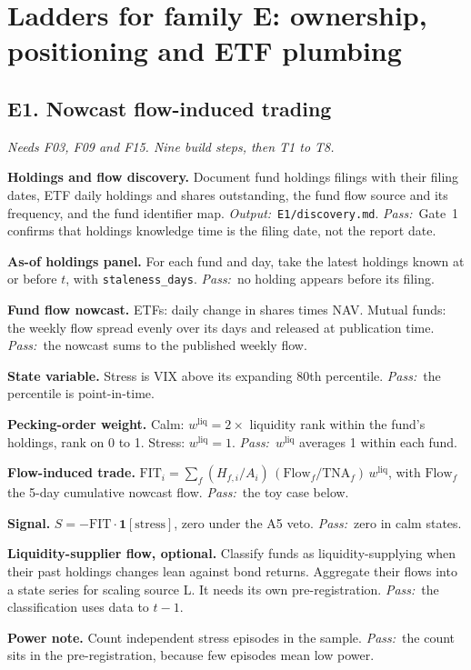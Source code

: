 \documentclass[11pt,letterpaper]{article}
\makeatletter
\newcommand{\code}[1]{\texttt{#1}}
\newcommand{\ind}[1]{\mathbf{1}\!\left[#1\right]}
\newcommand{\FIT}{\mathrm{FIT}}
\newcommand*{\twodigit}[1]{\expandafter\@twodigit\csname c@#1\endcsname}
\newcommand*{\@twodigit}[1]{\ifnum#1<10 0\fi\number#1}
\newcommand{\stepname}[1]{\textbf{#1.}}
\newcommand{\Out}{\textit{Output:}~}
\newcommand{\Pass}{\textit{Pass:}~}
\makeatother
\begin{document}
\section{Ladders for family E: ownership, positioning and ETF plumbing}
\label{sec:laddersE}

\subsection{E1. Nowcast flow-induced trading}
\emph{Needs F03, F09 and F15. Nine build steps, then T1 to T8.}
\begin{ladder}[label=\textbf{E1.\twodigit*}]
\item \stepname{Holdings and flow discovery} Document fund holdings filings with their filing dates, ETF daily holdings and shares outstanding, the fund flow source and its frequency, and the fund identifier map. \Out \code{E1/discovery.md}. \Pass Gate~1 confirms that holdings knowledge time is the filing date, not the report date.
\item \stepname{As-of holdings panel} For each fund and day, take the latest holdings known at or before $t$, with \code{staleness_days}. \Pass no holding appears before its filing.
\item \stepname{Fund flow nowcast} ETFs: daily change in shares times NAV. Mutual funds: the weekly flow spread evenly over its days and released at publication time. \Pass the nowcast sums to the published weekly flow.
\item \stepname{State variable} Stress is VIX above its expanding 80th percentile. \Pass the percentile is point-in-time.
\item \stepname{Pecking-order weight} Calm: $w^{\mathrm{liq}}=2\times$ liquidity rank within the fund's holdings, rank on 0 to 1. Stress: $w^{\mathrm{liq}}=1$. \Pass $w^{\mathrm{liq}}$ averages 1 within each fund.
\item \stepname{Flow-induced trade} $\FIT_i=\sum_f (H_{f,i}/A_i)\,(\mathrm{Flow}_f/\mathrm{TNA}_f)\,w^{\mathrm{liq}}$, with $\mathrm{Flow}_f$ the 5-day cumulative nowcast flow. \Pass the toy case below.
\item \stepname{Signal} $S=-\FIT\cdot\ind{\text{stress}}$, zero under the A5 veto. \Pass zero in calm states.
\item \stepname{Liquidity-supplier flow, optional} Classify funds as liquidity-supplying when their past holdings changes lean against bond returns. Aggregate their flows into a state series for scaling source L. It needs its own pre-registration. \Pass the classification uses data to $t-1$.
\item \stepname{Power note} Count independent stress episodes in the sample. \Pass the count sits in the pre-registration, because few episodes mean low power.
\end{ladder}
\end{document}

